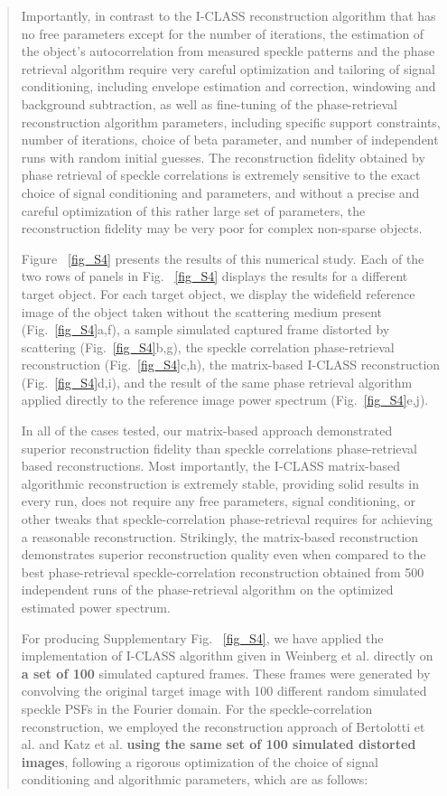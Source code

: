 \documentclass[12pt]{article}
\newenvironment{finished_ourresponse}
    {\begin{tcolorbox}[width=\linewidth,breakable,enhanced,colback=gray!5,colframe=finished_responsecolor!50,title=Response,left=5pt,right=5pt]}
    {\end{tcolorbox}}
\begin{document}
\begin{finished_ourresponse}
\begin{quote}
        Importantly, in contrast to the I-CLASS reconstruction algorithm that has no free parameters except for the number of iterations, the estimation of the object's autocorrelation from measured speckle patterns and the phase retrieval algorithm require very careful optimization and tailoring of signal conditioning, including envelope estimation and correction, windowing and background subtraction, as well as fine-tuning of the phase-retrieval reconstruction algorithm parameters, including specific support constraints, number of iterations, choice of beta parameter, and number of independent runs with random initial guesses. The reconstruction fidelity obtained by phase retrieval of speckle correlations is extremely sensitive to the exact choice of signal conditioning and parameters, and without a precise and careful optimization of this rather large set of parameters, the reconstruction fidelity may be very poor for complex non-sparse objects. 

        Figure ~\ref{fig_S4} presents the results of this numerical study. Each of the two rows of panels in Fig. ~\ref{fig_S4} displays the results for a different target object.  For each target object, we display the widefield reference image of the object taken without the scattering medium present (Fig.~\ref{fig_S4}a,f), a sample simulated captured frame distorted by scattering (Fig.~\ref{fig_S4}b,g), the speckle correlation phase-retrieval reconstruction (Fig.~\ref{fig_S4}c,h), the matrix-based I-CLASS reconstruction (Fig.~\ref{fig_S4}d,i), and the result of the same phase retrieval algorithm applied directly to the reference image power spectrum (Fig.~\ref{fig_S4}e,j).
        
        In all of the cases tested, our matrix-based approach demonstrated superior reconstruction fidelity than speckle correlations phase-retrieval based reconstructions. Most importantly, the I-CLASS matrix-based algorithmic reconstruction is extremely stable, providing solid results in every run, does not require any free parameters, signal conditioning, or other tweaks that speckle-correlation phase-retrieval requires for achieving a reasonable reconstruction. Strikingly, the matrix-based reconstruction demonstrates superior reconstruction quality even when compared to the best phase-retrieval speckle-correlation reconstruction obtained from 500 independent runs of the phase-retrieval algorithm on the optimized estimated power spectrum.

        For producing Supplementary Fig. ~\ref{fig_S4}, we have applied the implementation of I-CLASS algorithm given in Weinberg et al.\cite{weinberg2024noninvasive} directly on \textbf{a set of 100} simulated captured frames. These frames were generated by convolving the original target image with 100 different random simulated speckle PSFs in the Fourier domain.
        For the speckle-correlation reconstruction, we employed the reconstruction approach of Bertolotti et al. and Katz et al. \cite{bert12, katz14} \textbf{using the same set of 100 simulated distorted images}, following a rigorous optimization of the choice of signal conditioning and algorithmic parameters, which are as follows:


\end{quote}
\end{finished_ourresponse}
\end{document}
